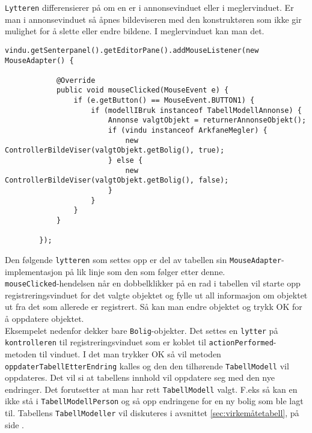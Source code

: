 \texttt{Lytteren} differensierer på om en er i annonsevinduet eller i meglervinduet. Er man i annonsevinduet så åpnes bildeviseren med den konstruktøren som ikke gir mulighet for å slette eller endre bildene. I meglervinduet kan man det.

\begin{lstlisting}[caption=\texttt{Lytter} for museklikk i output-vinduet]
        vindu.getSenterpanel().getEditorPane().addMouseListener(new MouseAdapter() {

            @Override
            public void mouseClicked(MouseEvent e) {
                if (e.getButton() == MouseEvent.BUTTON1) {
                    if (modellIBruk instanceof TabellModellAnnonse) {
                        Annonse valgtObjekt = returnerAnnonseObjekt();
                        if (vindu instanceof ArkfaneMegler) {
                            new ControllerBildeViser(valgtObjekt.getBolig(), true);
                        } else {
                            new ControllerBildeViser(valgtObjekt.getBolig(), false);
                        }
                    }
                }
            }

        });

\end{lstlisting}


Den følgende \texttt{lytteren} som settes opp er del av tabellen sin \texttt{MouseAdapter}-implementasjon på lik linje som den som følger etter denne. \\
\texttt{mouseClicked}-hendelsen når en dobbelklikker på en rad i tabellen vil starte opp registreringsvinduet for det valgte objektet og fylle ut all informasjon om objektet ut fra det som allerede er registrert. Så kan man endre objektet og trykk OK for å oppdatere objektet. \\
Eksempelet nedenfor dekker bare \texttt{Bolig}-objekter. Det settes en \texttt{lytter} på \texttt{kontrolleren} til registreringsvinduet som er koblet til \texttt{actionPerformed}-metoden til vinduet. I det man trykker OK så vil metoden \texttt{oppdaterTabellEtterEndring} kalles og den den tilhørende \texttt{TabellModell} vil oppdateres. Det vil si at tabellens innhold vil oppdatere seg med den nye endringer. Det forutsetter at man har rett \texttt{TabellModell} valgt. F.eks så kan en ikke stå i \texttt{TabellModellPerson} og så opp endringene for en ny bolig som ble lagt til. 
Tabellens \texttt{TabellModeller} vil diskuteres i avsnittet \ref{sec:virkemåtetabell}, på side \pageref{sec:virkemåtetabell}.

